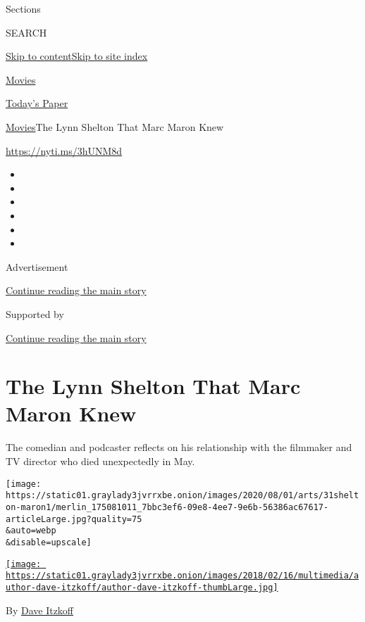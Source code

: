 Sections

SEARCH

\protect\hyperlink{site-content}{Skip to
content}\protect\hyperlink{site-index}{Skip to site index}

\href{https://www.nytimes3xbfgragh.onion/section/movies}{Movies}

\href{https://myaccount.nytimes3xbfgragh.onion/auth/login?response_type=cookie\&client_id=vi}{}

\href{https://www.nytimes3xbfgragh.onion/section/todayspaper}{Today's
Paper}

\href{/section/movies}{Movies}\textbar{}The Lynn Shelton That Marc Maron
Knew

\url{https://nyti.ms/3hUNM8d}

\begin{itemize}
\item
\item
\item
\item
\item
\item
\end{itemize}

Advertisement

\protect\hyperlink{after-top}{Continue reading the main story}

Supported by

\protect\hyperlink{after-sponsor}{Continue reading the main story}

\hypertarget{the-lynn-shelton-that-marc-maron-knew}{%
\section{The Lynn Shelton That Marc Maron
Knew}\label{the-lynn-shelton-that-marc-maron-knew}}

The comedian and podcaster reflects on his relationship with the
filmmaker and TV director who died unexpectedly in May.

\texttt{[image: https://static01.graylady3jvrrxbe.onion/images/2020/08/01/arts/31shelton-maron1/merlin\_175081011\_7bbc3ef6-09e8-4ee7-9e6b-56386ac67617-articleLarge.jpg?quality=75\\\&auto=webp\\\&disable=upscale]}

\href{https://www.nytimes3xbfgragh.onion/by/dave-itzkoff}{\texttt{[image: https://static01.graylady3jvrrxbe.onion/images/2018/02/16/multimedia/author-dave-itzkoff/author-dave-itzkoff-thumbLarge.jpg]}}

By \href{https://www.nytimes3xbfgragh.onion/by/dave-itzkoff}{Dave
Itzkoff}

